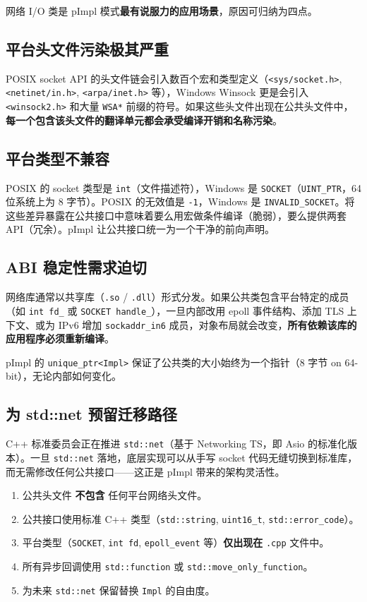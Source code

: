 \documentclass[12pt,a4paper,fontset=fandol]{ctexbook}
\newcommand{\Tp}[1]{\texttt{#1}}
\begin{document}
网络 I/O 类是 pImpl 模式\textbf{最有说服力的应用场景}，原因可归纳为四点。

\subsection{平台头文件污染极其严重}

POSIX socket API 的头文件链会引入数百个宏和类型定义（\Tp{<sys/socket.h>}, \Tp{<netinet/in.h>}, \Tp{<arpa/inet.h>} 等），Windows Winsock 更是会引入 \Tp{<winsock2.h>} 和大量 \Tp{WSA*} 前缀的符号。如果这些头文件出现在公共头文件中，\textbf{每一个包含该头文件的翻译单元都会承受编译开销和名称污染}。

\subsection{平台类型不兼容}

POSIX 的 socket 类型是 \Tp{int}（文件描述符），Windows 是 \Tp{SOCKET}（\Tp{UINT\_PTR}，64 位系统上为 8 字节）。POSIX 的无效值是 \Tp{-1}，Windows 是 \Tp{INVALID\_SOCKET}。将这些差异暴露在公共接口中意味着要么用宏做条件编译（脆弱），要么提供两套 API（冗余）。pImpl 让公共接口统一为一个干净的前向声明。

\subsection{ABI 稳定性需求迫切}

网络库通常以共享库（\Tp{.so} / \Tp{.dll}）形式分发。如果公共类包含平台特定的成员（如 \Tp{int fd\_} 或 \Tp{SOCKET handle\_}），一旦内部改用 epoll 事件结构、添加 TLS 上下文、或为 IPv6 增加 \Tp{sockaddr\_in6} 成员，对象布局就会改变，\textbf{所有依赖该库的应用程序必须重新编译}。

pImpl 的 \Tp{unique\_ptr<Impl>} 保证了公共类的大小始终为一个指针（8 字节 on 64-bit），无论内部如何变化。

\subsection{为 std::net 预留迁移路径}

C++ 标准委员会正在推进 \Tp{std::net}（基于 Networking TS，即 Asio 的标准化版本）。一旦 \Tp{std::net} 落地，底层实现可以从手写 socket 代码无缝切换到标准库，而无需修改任何公共接口——这正是 pImpl 带来的架构灵活性。

\begin{bestpractice}[title=网络类 pImpl 设计原则]
\begin{enumerate}
\item 公共头文件 \textbf{不包含} 任何平台网络头文件。
\item 公共接口使用标准 C++ 类型（\Tp{std::string}, \Tp{uint16\_t}, \Tp{std::error\_code}）。
\item 平台类型（\Tp{SOCKET}, \Tp{int fd}, \Tp{epoll\_event} 等）\textbf{仅出现在} \Tp{.cpp} 文件中。
\item 所有异步回调使用 \Tp{std::function} 或 \Tp{std::move\_only\_function}。
\item 为未来 \Tp{std::net} 保留替换 \Tp{Impl} 的自由度。
\end{enumerate}
\end{bestpractice}
\end{document}

